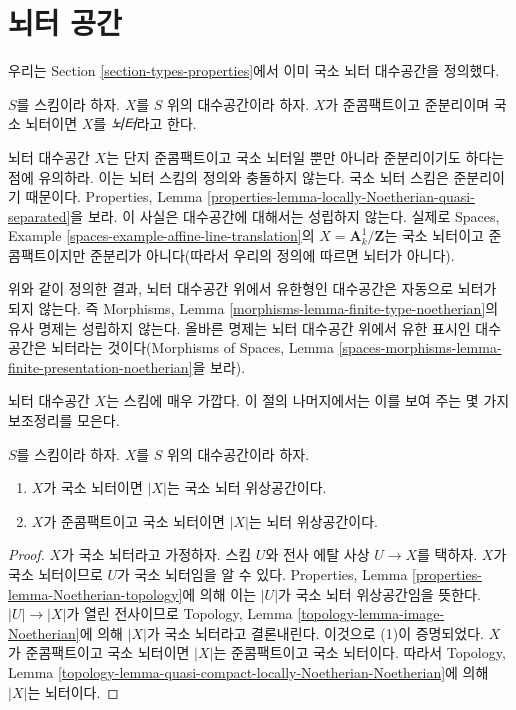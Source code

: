 \section{뇌터 공간}
\label{section-noetherian}

\noindent
우리는 Section \ref{section-types-properties}에서 이미 국소 뇌터
대수공간을 정의했다.

\begin{definition}
\label{definition-noetherian}
$S$를 스킴이라 하자. $X$를 $S$ 위의 대수공간이라 하자.
$X$가 준콤팩트이고 준분리이며 국소 뇌터이면 $X$를
{\it 뇌터}라고 한다.
\end{definition}

\noindent
뇌터 대수공간 $X$는 단지 준콤팩트이고 국소 뇌터일 뿐만 아니라
준분리이기도 하다는 점에 유의하라. 이는 뇌터 스킴의 정의와
충돌하지 않는다. 국소 뇌터 스킴은 준분리이기 때문이다.
Properties, Lemma
\ref{properties-lemma-locally-Noetherian-quasi-separated}을 보라.
이 사실은 대수공간에 대해서는 성립하지 않는다. 실제로 Spaces,
Example \ref{spaces-example-affine-line-translation}의
$X = \mathbf{A}^1_k/\mathbf{Z}$는 국소 뇌터이고 준콤팩트이지만
준분리가 아니다(따라서 우리의 정의에 따르면 뇌터가 아니다).

\medskip\noindent
위와 같이 정의한 결과, 뇌터 대수공간 위에서 유한형인 대수공간은
자동으로 뇌터가 되지 않는다. 즉 Morphisms, Lemma
\ref{morphisms-lemma-finite-type-noetherian}의 유사 명제는 성립하지
않는다. 올바른 명제는 뇌터 대수공간 위에서 유한 표시인 대수공간은
뇌터라는 것이다(Morphisms of Spaces, Lemma
\ref{spaces-morphisms-lemma-finite-presentation-noetherian}을 보라).

\medskip\noindent
뇌터 대수공간 $X$는 스킴에 매우 가깝다. 이 절의 나머지에서는
이를 보여 주는 몇 가지 보조정리를 모은다.

\begin{lemma}
\label{lemma-Noetherian-topology}
$S$를 스킴이라 하자. $X$를 $S$ 위의 대수공간이라 하자.
\begin{enumerate}
\item $X$가 국소 뇌터이면 $|X|$는 국소 뇌터 위상공간이다.
\item $X$가 준콤팩트이고 국소 뇌터이면 $|X|$는 뇌터 위상공간이다.
\end{enumerate}
\end{lemma}

\begin{proof}
$X$가 국소 뇌터라고 가정하자.
스킴 $U$와 전사 에탈 사상 $U \to X$를 택하자.
$X$가 국소 뇌터이므로 $U$가 국소 뇌터임을 알 수 있다.
Properties, Lemma \ref{properties-lemma-Noetherian-topology}에 의해
이는 $|U|$가 국소 뇌터 위상공간임을 뜻한다.
$|U| \to |X|$가 열린 전사이므로 Topology, Lemma
\ref{topology-lemma-image-Noetherian}에 의해 $|X|$가 국소 뇌터라고
결론내린다. 이것으로 (1)이 증명되었다. $X$가 준콤팩트이고
국소 뇌터이면 $|X|$는 준콤팩트이고 국소 뇌터이다. 따라서
Topology, Lemma
\ref{topology-lemma-quasi-compact-locally-Noetherian-Noetherian}에 의해
$|X|$는 뇌터이다.
\end{proof}

